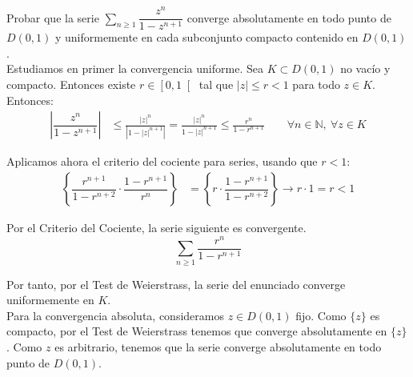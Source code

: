 \documentclass[12pt]{article}
\begin{document}
    \begin{ejercicio}[2.5 puntos] Probar que la serie $\displaystyle \sum\limits_{n\geq 1} \dfrac{z^n}{1-z^{n+1}}$ converge absolutamente en todo punto de $D(0, 1)$ y uniformemente en cada subconjunto compacto contenido en $D(0, 1)$.\\

        Estudiamos en primer la convergencia uniforme. Sea $K\subset D(0, 1)$ no vacío y compacto. Entonces existe $r \in \left[0,1\right[$ tal que $|z|\leq r<1$ para todo $z \in K$. Entonces:
        \begin{align*}
            \left|\dfrac{z^n}{1-z^{n+1}}\right| &\leq \frac{|z|^n}{\left|1 - |z|^{n+1}\right|} = \frac{|z|^n}{1 - |z|^{n+1}}\leq \frac{r^n}{1 - r^{n+1}} \qquad \forall n \in \mathbb{N},~\forall z \in K
        \end{align*}

        Aplicamos ahora el criterio del cociente para series, usando que $r<1$:
        \begin{align*}
            \left\{\dfrac{r^{n+1}}{1 - r^{n+2}} \cdot \dfrac{1 - r^{n+1}}{r^n} \right\}&= \left\{r \cdot \dfrac{1 - r^{n+1}}{1 - r^{n+2}}\right\} \to r\cdot 1 = r<1
        \end{align*}
        
        Por el Criterio del Cociente, la serie siguiente es convergente.
        \begin{equation*}
            \sum_{n \geq 1} \frac{r^n}{1 - r^{n+1}}
        \end{equation*}
        
        Por tanto, por el Test de Weierstrass, la serie del enunciado converge uniformemente en $K$.\\

        Para la convergencia absoluta, consideramos $z\in D(0,1)$ fijo. Como $\{z\}$ es compacto, por el Test de Weierstrass tenemos que converge absolutamente en $\{z\}$. Como $z$ es arbitrario, tenemos que la serie converge absolutamente en todo punto de $D(0, 1)$.
    \end{ejercicio}
\end{document}
